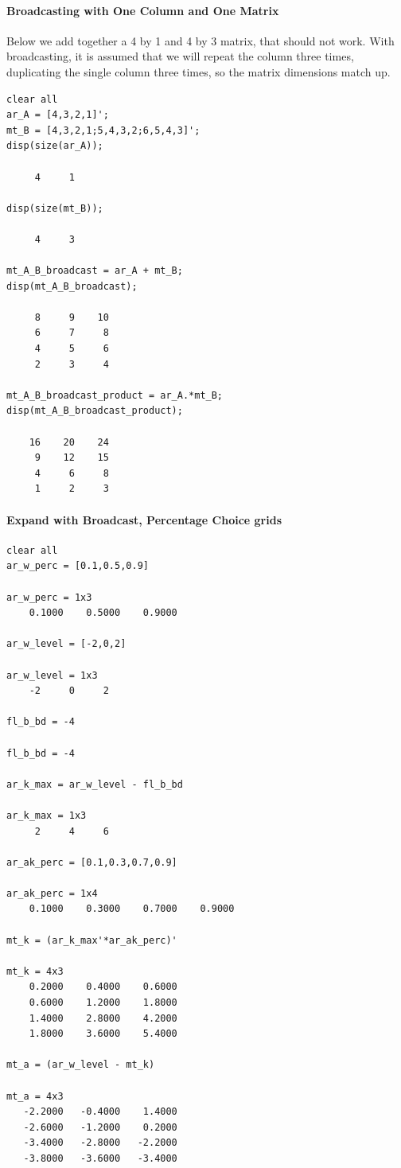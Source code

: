 \documentclass[
]{book}
\begin{document}
\hypertarget{broadcasting-with-one-column-and-one-matrix}{%
\paragraph{Broadcasting with One Column and One Matrix}\label{broadcasting-with-one-column-and-one-matrix}}

Below we add together a 4 by 1 and 4 by 3 matrix, that should not work.
With broadcasting, it is assumed that we will repeat the column three
times, duplicating the single column three times, so the matrix
dimensions match up.

\begin{verbatim}
clear all
ar_A = [4,3,2,1]';
mt_B = [4,3,2,1;5,4,3,2;6,5,4,3]';
disp(size(ar_A));

     4     1

disp(size(mt_B));

     4     3

mt_A_B_broadcast = ar_A + mt_B;
disp(mt_A_B_broadcast);

     8     9    10
     6     7     8
     4     5     6
     2     3     4

mt_A_B_broadcast_product = ar_A.*mt_B;
disp(mt_A_B_broadcast_product);

    16    20    24
     9    12    15
     4     6     8
     1     2     3
\end{verbatim}

\hypertarget{expand-with-broadcast-percentage-choice-grids}{%
\paragraph{Expand with Broadcast, Percentage Choice grids}\label{expand-with-broadcast-percentage-choice-grids}}

\begin{verbatim}
clear all
ar_w_perc = [0.1,0.5,0.9]

ar_w_perc = 1x3    
    0.1000    0.5000    0.9000

ar_w_level = [-2,0,2]

ar_w_level = 1x3    
    -2     0     2

fl_b_bd = -4

fl_b_bd = -4

ar_k_max = ar_w_level - fl_b_bd

ar_k_max = 1x3    
     2     4     6

ar_ak_perc = [0.1,0.3,0.7,0.9]

ar_ak_perc = 1x4    
    0.1000    0.3000    0.7000    0.9000

mt_k = (ar_k_max'*ar_ak_perc)'

mt_k = 4x3    
    0.2000    0.4000    0.6000
    0.6000    1.2000    1.8000
    1.4000    2.8000    4.2000
    1.8000    3.6000    5.4000

mt_a = (ar_w_level - mt_k)

mt_a = 4x3    
   -2.2000   -0.4000    1.4000
   -2.6000   -1.2000    0.2000
   -3.4000   -2.8000   -2.2000
   -3.8000   -3.6000   -3.4000
\end{verbatim}
\end{document}
